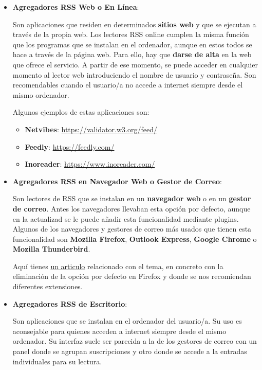 \begin{itemize}
    \item \textbf{Agregadores RSS Web o En Línea}:

    Son aplicaciones que residen en determinados \textbf{sitios web} y que se ejecutan a través de la propia web. Los lectores RSS online cumplen la misma función que los programas que se instalan en el ordenador, aunque en estos todos se hace a través de la página web. Para ello, hay que \textbf{darse de alta} en la web que ofrece el servicio. A partir de ese momento, se puede acceder en cualquier momento al lector web introduciendo el nombre de usuario y contraseña. Son recomendables cuando el usuario/a no accede a internet siempre desde el mismo ordenador.

    Algunos ejemplos de estas aplicaciones son:

    \begin{itemize}
        \item \textbf{Netvibes}: \url{https://validator.w3.org/feed/}
        \item \textbf{Feedly}: \url{https://feedly.com/}
        \item \textbf{Inoreader}: \url{https://www.inoreader.com/}
    \end{itemize}

    \item \textbf{Agregadores RSS en Navegador Web o Gestor de Correo}:

    Son lectores de RSS que se instalan en un \textbf{navegador web} o en un \textbf{gestor de correo}. Antes los navegadores llevaban esta opción por defecto, aunque en la actualizad se le puede añadir esta funcionalidad mediante plugins. Algunos de los navegadores y gestores de correo más usados que tienen esta funcionalidad son \textbf{Mozilla Firefox}, \textbf{Outlook Express}, \textbf{Google Chrome} o \textbf{Mozilla Thunderbird}.

    Aquí tienes \href{https://www.muylinux.com/2018/10/16/firefox-64-eliminara-soporte-rss/}{un articulo} relacionado con el tema, en concreto con la eliminación de la opción por defecto en Firefox y donde se nos recomiendan diferentes extensiones.

    \item \textbf{Agregadores RSS de Escritorio}:

    Son aplicaciones que se instalan en el ordenador del usuario/a. Su uso es aconsejable para quienes acceden a internet siempre desde el mismo ordenador. Su interfaz suele ser parecida a la de los gestores de correo con un panel donde se agrupan suscripciones y otro donde se accede a la entradas individuales para su lectura.


\end{itemize}
